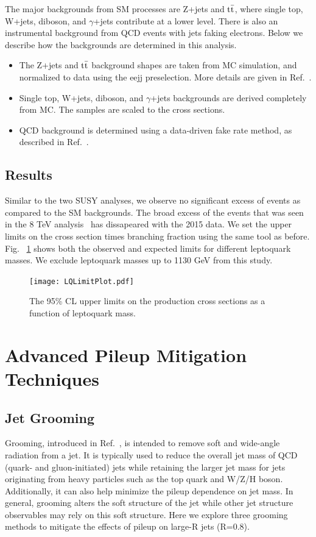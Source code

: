 The major backgrounds from SM processes are Z+jets and $\rm t\bar{t}$, where single top,
 W+jets, diboson, and $\gamma$+jets contribute at a lower level. There is also an instrumental background from QCD events with jets faking electrons. Below we describe how the
backgrounds are determined in this analysis.
\begin{itemize}
\item The Z+jets and $\rm t\bar{t}$ background shapes are taken from MC simulation, and normalized
 to data using the eejj preselection. More details are given in Ref.~\cite{CMS-PAS-EXO-16-043}.
\item Single top, W+jets, diboson, and $\gamma$+jets backgrounds are derived completely from
 MC. The samples are scaled to the cross sections.
 \item QCD background is determined using a data-driven fake rate method, as
 described in Ref.~\cite{CMS-PAS-EXO-16-043}.

\end{itemize}




\subsection{Results}
Similar to the two SUSY analyses, we observe no significant excess of events as compared to the SM backgrounds. The broad excess of the events that was seen in the 8 TeV analysis~\cite{CMS-PAS-EXO-12-041} has dissapeared with the 2015 data. We set the upper limits on the cross section times branching fraction using the same tool as before. Fig. ~\ref{figure:LimitLQ12016} shows both the observed and expected limits for different leptoquark masses. We exclude leptoquark masses up to 1130 GeV from this study. 

\begin{figure}[h]
\centering
\texttt{[image: LQLimitPlot.pdf]}

\caption{\label{figure:LimitLQ12016}The 95\% CL upper limits on the production cross sections as a function of leptoquark mass.}
\end{figure}



\section{Advanced Pileup Mitigation Techniques}

\subsection{Jet Grooming }
Grooming, introduced in Ref.~\cite{Grooming}, is intended to remove soft and wide-angle radiation from a jet.  
It is typically used to reduce the overall jet mass of QCD (quark- and gluon-initiated) jets while retaining the larger jet mass for jets originating from heavy particles such as the top quark and W/Z/H boson. Additionally, it can also help minimize the pileup dependence on jet mass. In general, grooming alters the soft structure of the jet while other jet structure observables may rely on this soft structure. Here we explore three grooming methods to mitigate the effects of pileup on large-R jets (R=0.8).


